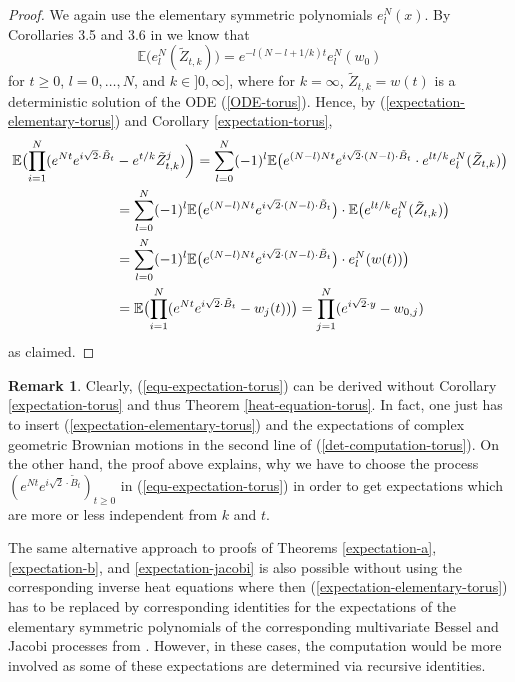 \documentclass[reqno]{amsart}
\theoremstyle{plain}
\theoremstyle{definition}
\newtheorem{remark}[theorem]{Remark}
\numberwithin{equation}{section}
\begin{document}
\begin{proof}
We again use the elementary
symmetric polynomials $e_l^N(x)$. By Corollaries 3.5 and 3.6  in \cite{RV2} we know that
\begin{equation}\label{expectation-elementary-torus}
  \mathbb E\bigl(e_l^N(\tilde Z_{t,k})\bigr)= e^{-l(N-l+1/k)t} e_l^N(w_0)
  \end{equation}
for $t\ge0$, $l=0,\ldots,N$, and $k\in ]0,\infty]$, where for $k=\infty$, $\tilde Z_{t,k}=w(t)$ is a deterministic solution of the ODE
   (\ref{ODE-torus}).
   Hence, by (\ref{expectation-elementary-torus}) and Corollary \ref{expectation-torus},
   \begin{align}\label{det-computation-torus}
     \mathbb E\bigl(\prod_{i=1}^N ( e^{Nt}e^{ i\sqrt 2 \cdot \tilde B_t } &- e^{t/k}\tilde Z_{t,k}^j )\biggr)=
     \sum_{l=0}^N (-1)^l\mathbb E\bigl( e^{(N-l)Nt}e^{ i\sqrt 2\cdot(N-l) \cdot \tilde B_t }  \cdot e^{lt/k}   e_l^N( \tilde Z_{t,k})\bigr)\notag\\
     &=\sum_{l=0}^N (-1)^l\mathbb E\bigl( e^{(N-l)Nt}e^{ i\sqrt 2\cdot(N-l) \cdot \tilde B_t } \bigr)
     \cdot\mathbb E\bigl( e^{lt/k}   e_l^N( \tilde Z_{t,k})\bigr)\notag\\
 &=\sum_{l=0}^N (-1)^l\mathbb E\bigl( e^{(N-l)Nt}e^{ i\sqrt 2\cdot(N-l) \cdot \tilde B_t } \bigr)   \cdot e_l^N( w(t))\bigr)\notag\\
 &=\mathbb E\bigl(\prod_{i=1}^N ( e^{Nt}e^{ i\sqrt 2 \cdot \tilde B_t } - w_j(t))\bigr)
     = \prod_{j=1}^N (e^{ i\sqrt 2 \cdot y}-w_{0,j})
     \end{align}
     as claimed.
   \end{proof}

\begin{remark} Clearly, (\ref{equ-expectation-torus}) can be derived without
  Corollary \ref{expectation-torus} and thus Theorem \ref{heat-equation-torus}. In fact, one just has to insert 
  (\ref{expectation-elementary-torus}) and the expectations of complex geometric Brownian motions in the second line of
  (\ref{det-computation-torus}). On the other hand, the proof above explains, why we have to choose
  the process $(e^{Nt}e^{ i\sqrt 2 \cdot \tilde B_t })_{t\ge0}$ in (\ref{equ-expectation-torus}) in order to get  expectations which are more or less
  independent from $k$ and $t$.

  The same alternative approach to proofs of Theorems \ref{expectation-a}, \ref{expectation-b}, and \ref{expectation-jacobi}
  is also possible without using the corresponding inverse heat equations where then  (\ref{expectation-elementary-torus})
  has to be replaced by corresponding identities for the expectations of the elementary symmetric polynomials
  of the corresponding multivariate Bessel and Jacobi processes from \cite{KVW, V2}. However, in these cases, the computation would be more involved
  as some of these expectations are determined via recursive identities.
     \end{remark}
\end{document}

